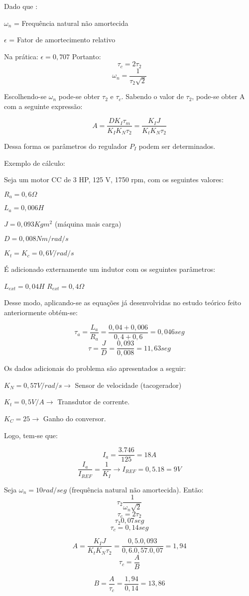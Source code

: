 Dado que :

$\omega_{n}$ =  Frequência natural não amortecida

$\epsilon$ = Fator de amortecimento relativo


Na prática: $\epsilon = 0,707$
Portanto:
\[\tau_{c} = 2\tau_{2}\]
\[\omega_{n} = \frac{1}{\tau_{2}\sqrt{2}}\]

Escolhendo-se $\omega_{n}$ pode-se obter $\tau_{2}$ e $\tau_{c}$. Sabendo o valor de $\tau_{2}$, pode-se obter A com a seguinte expressão:

\[A = \frac{DK_{I}\tau_{m}}{K_{I}K_{N}\tau_{2}} = \frac{K_{I}J}{K_{t}K_{N}\tau_{2}}\]

Dessa forma os parâmetros do regulador $P_{I}$ podem ser determinados.

Exemplo de cálculo:

Seja um motor CC de 3 HP, 125 V, 1750 rpm, com os seguintes valores:

$R_{a} = 0,6 \Omega$ 

$L_{a} = 0,006 H$

$J = 0,093 Kgm^{2}$ (máquina mais carga)

$D = 0,008 Nm/rad/s$

$K_{t} = K_{c} = 0,6 V/rad/s$

É adicionado externamente um indutor com os seguintes parâmetros:

$L_{ext} = 0,04H$
$R_{ext} = 0,4\Omega$

Desse modo, aplicando-se as equações já desenvolvidas no estudo teórico feito anteriormente obtém-se:

\[\tau_{a} = \frac{L_{a}}{R_{a}} = \frac{0,04 + 0,006}{0,4 + 0,6} = 0,046 seg\]
\[\tau = \frac{J}{D} = \frac{0,093}{0,008} = 11,63 seg\]

Os dados adicionais do problema são apresentados a seguir:

$K_{N} = 0,57 V/rad/s  \rightarrow $ Sensor de velocidade (tacogerador)

$K_{t} = 0,5 V/A  \rightarrow$ Transdutor de corrente.

$K_{C} = 25  \rightarrow$ Ganho do conversor.

Logo, tem-se que:

\[I_{a} = \frac{3.746}{125} = 18A\]
\[\frac{I_{a}}{I_{REF}} = \frac{1}{K_{I}} \rightarrow I_{REF} = 0,5.18 = 9 V \]

Seja $\omega_{n} = 10 rad/seg$ (frequência natural não amortecida). Então:
\[\tau_{2} \frac{1}{\omega_{n}\sqrt{2}}\]
\[\tau_{c} = 2\tau_{2}\]
\[\tau_{2} 0,07 seg\]
\[\tau_{c} = 0,14 seg\]

\[A = \frac{K_{I}J}{K_{t}K_{N}\tau_{2}} = \frac{0,5.0,093}{0,6.0,57.0,07} = 1,94\]
\[\tau_{c} = \frac{A}{B}\]

\[B = \frac{A}{\tau_{c}} = \frac{1,94}{0,14} = 13,86 \]

